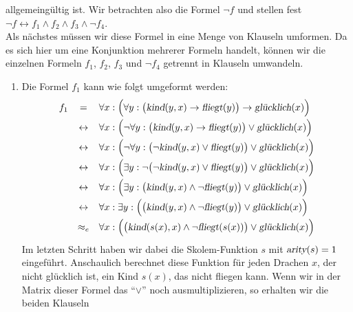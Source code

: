 allgemeing\"{u}ltig ist.  Wir betrachten also die Formel $\neg f$ und stellen fest \\[0.2cm]
\hspace*{1.3cm} $\neg f \leftrightarrow f_1 \wedge f_2 \wedge f_3 \wedge \neg f_4$. \\[0.2cm]
Als n\"{a}chstes m\"{u}ssen wir diese Formel in eine Menge von Klauseln umformen.
Da es sich hier um eine Konjunktion mehrerer Formeln handelt, k\"{o}nnen wir 
die einzelnen Formeln 
 $f_1$, $f_2$, $f_3$ und  $\neg f_4$  getrennt in Klauseln umwandeln.
\begin{enumerate}
\item Die Formel $f_1$ kann wie folgt umgeformt werden:
 $$ 
  \begin{array}{lcl}
    f_1 & =           & \forall x:\Bigl(\forall y: \big(\textsl{kind}(y,x)
    \rightarrow \textsl{fliegt}(y)\big) \rightarrow \textsl{gl\"{u}cklich}(x) \Bigr) \\[0.2cm]
    &\leftrightarrow & \forall x: \Bigl(\neg \forall y: \big( \textsl{kind}(y,x) \rightarrow \textsl{fliegt}(y)\big) \vee \textsl{gl\"{u}cklich}(x) \Bigr)\\[0.2cm]
    &\leftrightarrow & \forall x: \Bigl(\neg \forall y: \big( \neg \textsl{kind}(y,x) \vee \textsl{fliegt}(y)\big) \vee \textsl{gl\"{u}cklich}(x) \Bigr)\\[0.2cm]
    &\leftrightarrow & \forall x: \Bigl(\exists y: \neg \big( \neg \textsl{kind}(y,x) \vee \textsl{fliegt}(y)\big) \vee \textsl{gl\"{u}cklich}(x) \Bigr)\\[0.2cm]
    &\leftrightarrow & \forall x: \Bigl( \exists y: \big(\textsl{kind}(y,x) \wedge \neg  \textsl{fliegt}(y)\big) \vee \textsl{gl\"{u}cklich}(x) \Bigr)\\[0.2cm]
    &\leftrightarrow & \forall x:  \exists y: \Bigl(\big( \textsl{kind}(y,x) \wedge \neg  \textsl{fliegt}(y)\big) \vee \textsl{gl\"{u}cklich}(x) \Bigr)\\[0.2cm]
    &\approx_e & \forall x: \Bigl(\big( \textsl{kind}(s(x),x) \wedge \neg  \textsl{fliegt}(s(x))\big) \vee \textsl{gl\"{u}cklich}(x) \Bigr)\\
  \end{array}
     $$
      Im letzten Schritt haben wir dabei die Skolem-Funktion $s$ mit 
      $\textsl{arity}(s) = 1$ eingef\"{u}hrt.  Anschaulich berechnet diese Funktion f\"{u}r jeden
      Drachen $x$, der nicht gl\"{u}cklich ist, ein Kind $s(x)$, das nicht fliegen kann.
      Wenn wir in der Matrix dieser Formel das ``$\vee$'' noch ausmultiplizieren, so
      erhalten wir die beiden Klauseln 

\end{enumerate}
